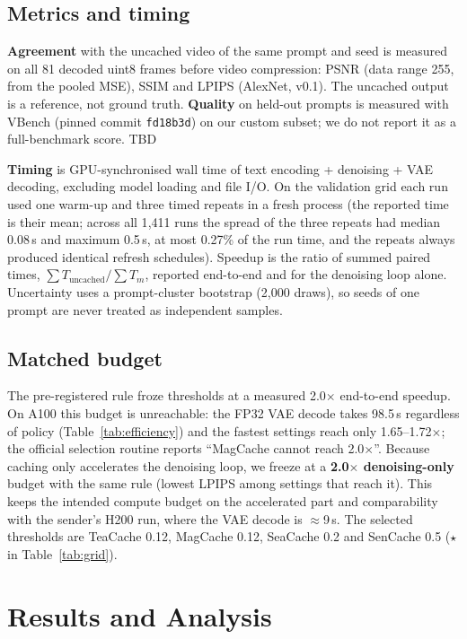 \documentclass[11pt,a4paper]{article}
\newcommand{\pending}{\textcolor{draftorange}{\textsf{TBD}}}
\begin{document}
\subsection{Metrics and timing}
\textbf{Agreement} with the uncached video of the same prompt and seed is measured on all 81 decoded uint8 frames before
video compression: PSNR (data range 255, from the pooled MSE), SSIM and LPIPS (AlexNet, v0.1). The uncached output is a
reference, not ground truth. \textbf{Quality} on held-out prompts is measured with VBench (pinned commit \texttt{fd18b3d})
on our custom subset; we do not report it as a full-benchmark score. \pending{}

\textbf{Timing} is GPU-synchronised wall time of text encoding + denoising + VAE decoding, excluding model loading and file
I/O. On the validation grid each run used one warm-up and three timed repeats in a fresh process (the reported time is
their mean; across all 1{,}411 runs the spread of the three repeats had median 0.08\,s and maximum 0.5\,s, at most 0.27\%
of the run time, and the repeats always produced identical refresh schedules). Speedup is the ratio of
summed paired times, $\sum T_{\text{uncached}}/\sum T_m$, reported end-to-end and for the denoising loop alone. Uncertainty
uses a prompt-cluster bootstrap (2{,}000 draws), so seeds of one prompt are never treated as independent samples.

\subsection{Matched budget}
The pre-registered rule froze thresholds at a measured 2.0$\times$ end-to-end speedup. On A100 this budget is unreachable:
the FP32 VAE decode takes 98.5\,s regardless of policy (Table~\ref{tab:efficiency}) and the fastest settings reach only
1.65--1.72$\times$; the official selection routine reports ``MagCache cannot reach 2.0$\times$''. Because caching only
accelerates the denoising loop, we freeze at a \textbf{2.0$\times$ denoising-only} budget with the same rule (lowest LPIPS
among settings that reach it). This keeps the intended compute budget on the accelerated part and comparability with the
sender's H200 run, where the VAE decode is $\approx$9\,s. The selected thresholds are TeaCache 0.12, MagCache 0.12, SeaCache
0.2 and SenCache 0.5 ($\star$ in Table~\ref{tab:grid}).

\section{Results and Analysis}
\end{document}

